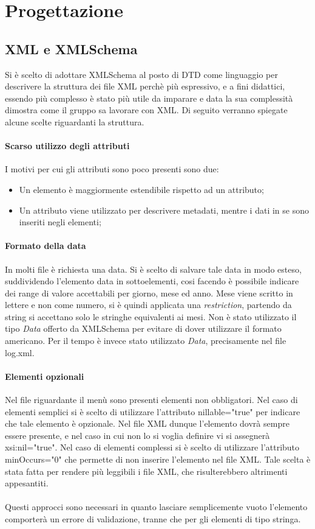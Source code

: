 \section{Progettazione}
\subsection{XML e XMLSchema}
Si è scelto di adottare XMLSchema al posto di DTD come linguaggio per descrivere la struttura dei file XML perchè più espressivo, e a fini didattici, essendo più complesso è stato più utile da imparare e data la sua complessità dimostra come il gruppo sa lavorare con XML. Di seguito verranno spiegate alcune scelte riguardanti la struttura.

\paragraph{Scarso utilizzo degli attributi}

I motivi per cui gli attributi sono poco presenti sono due:
\begin{itemize}
\item Un elemento è maggiormente estendibile rispetto ad un attributo;
\item Un attributo viene utilizzato per descrivere metadati, mentre i dati in se sono inseriti negli elementi;
\end{itemize}

\paragraph{Formato della data}
In molti file è richiesta una data. Si è scelto di salvare tale data in modo esteso, suddividendo l'elemento data in sottoelementi, cosi facendo è possibile indicare dei range di valore accettabili per giorno, mese ed anno. 
Mese viene scritto in lettere e non come numero, si è quindi applicata una \emph{restriction}, partendo da string si accettano solo le stringhe equivalenti ai mesi.
Non è stato utilizzato il tipo \emph{Data} offerto da XMLSchema per evitare di dover utilizzare il formato americano.
Per il tempo è invece stato utilizzato \emph{Data}, precisamente nel file log.xml.

\paragraph{Elementi opzionali}
Nel file riguardante il menù sono presenti elementi non obbligatori. Nel caso di elementi semplici si è scelto di utilizzare l'attributo nillable="true" per indicare che tale elemento è opzionale. Nel file XML dunque l'elemento dovrà sempre essere presente, e nel caso in cui non lo si voglia definire vi si assegnerà xsi:nil="true".  
Nel caso di elementi complessi si è scelto di utilizzare l'attributo minOccurs="0" che permette di non inserire l'elemento nel file XML. Tale scelta è stata fatta per rendere più leggibili i file XML, che risulterebbero altrimenti appesantiti.\\ \\
Questi approcci sono necessari in quanto lasciare semplicemente vuoto l'elemento comporterà un errore di validazione, tranne che per gli elementi di tipo stringa.

